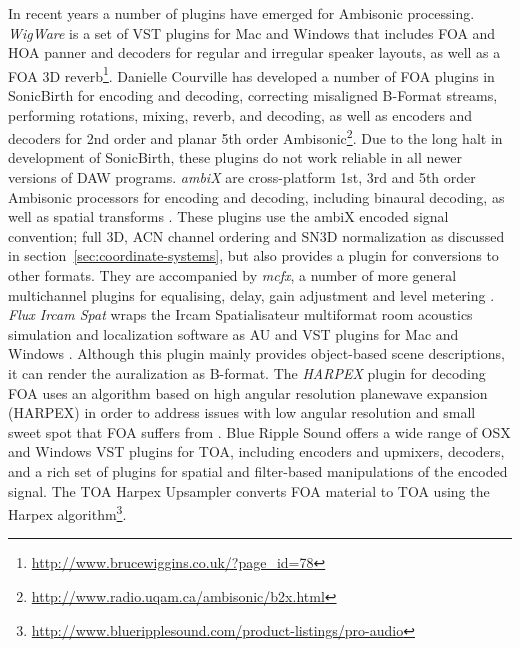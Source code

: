 \documentclass{article}
\begin{document}
In recent years a number of plugins have emerged for Ambisonic processing.
\emph{WigWare} is a set of VST plugins for Mac and Windows that includes FOA and HOA panner and decoders for regular and irregular speaker layouts, as well as a FOA 3D reverb\footnote{\href{http://www.brucewiggins.co.uk/?page\_id=78}{http://www.brucewiggins.co.uk/?page\_id=78}}.
Danielle Courville has developed a number of FOA plugins in SonicBirth for encoding and decoding, correcting misaligned B-Format streams, performing rotations, mixing, reverb, and decoding, as well as encoders and decoders for 2nd order and planar 5th order Ambisonic\footnote{\href{http://www.radio.uqam.ca/ambisonic/b2x.html}{http://www.radio.uqam.ca/ambisonic/b2x.html}}.
Due to the long halt in development of SonicBirth, these plugins do not work reliable in all newer versions of DAW programs.
\emph{ambiX} are cross-platform 1st, 3rd and 5th order Ambisonic processors for encoding and decoding, including binaural decoding, as well as spatial transforms \cite{Kronlachner2013:ambix,Kronlachner:2014ambi-transforms}.
These plugins use the ambiX encoded signal convention; full 3D, ACN channel ordering and SN3D normalization \cite{Nachbar:2011ambix} as discussed in section~\ref{sec:coordinate-systems}, but also provides a plugin for conversions to other formats.
They are accompanied by \emph{mcfx}, a number of more general multichannel plugins for equalising, delay, gain adjustment and level metering \cite{kronlachner2014:master}.
\emph{Flux Ircam Spat} wraps the Ircam Spatialisateur multiformat room acoustics simulation and localization software as AU and VST plugins for Mac and Windows \cite{flux:2010spat}.
Although this plugin mainly provides object-based scene descriptions, it can render the auralization as B-format.
The \emph{HARPEX} plugin for decoding FOA uses an algorithm based on high angular resolution planewave expansion (HARPEX) in order to address issues with low angular resolution and small sweet spot that FOA suffers from \cite{Berge:2010harpex}.
Blue Ripple Sound offers a wide range of OSX and Windows VST plugins for TOA, including encoders and upmixers, decoders, and a rich set of plugins for spatial and filter-based manipulations of the encoded signal.
The TOA Harpex Upsampler converts FOA material to TOA using the Harpex algorithm\footnote{\href{http://www.blueripplesound.com/product-listings/pro-audio}{http://www.blueripplesound.com/product-listings/pro-audio}}.




\end{document}
